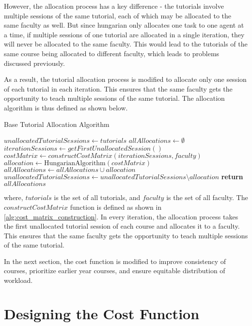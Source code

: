 However, the allocation process has a key difference - the tutorials involve multiple sessions of the same tutorial, each of which may be allocated to the same faculty as well. But since hungarian only allocates one task to one agent at a time, if multiple sessions of one tutorial are allocated in a single iteration, they will never be allocated to the same faculty. This would lead to the tutorials of the same course being allocated to different faculty, which leads to problems discussed previously.

As a result, the tutorial allocation process is modified to allocate only one session of each tutorial in each iteration. This ensures that the same faculty gets the opportunity to teach multiple sessions of the same tutorial. The allocation algorithm is thus defined as shown below.

\begin{algorithm}[H]
  \caption*{Base Tutorial Allocation Algorithm}
  \begin{algorithmic}
    \State $unallocatedTutorialSessions \gets tutorials$
    \State $allAllocations \gets \emptyset$
    \State $iterationSessions \gets getFirstUnallocatedSession()$
    \State $costMatrix \gets constructCostMatrix(iterationSessions, faculty)$
    \State $allocation \gets \text{HungarianAlgorithm}(costMatrix)$
    \State $allAllocations \gets allAllocations \cup allocation$
    \State $unallocatedTutorialSessions \gets unallocatedTutorialSessions \setminus allocation$
    \EndWhile
    \State \textbf{return} $allAllocations$
    \EndProcedure
  \end{algorithmic}
\end{algorithm}

where, $tutorials$ is the set of all tutorials, and $faculty$ is the set of all faculty. The $constructCostMatrix$ function is defined as shown in \autoref{alg:cost_matrix_construction}. In every iteration, the allocation process takes the first unallocated tutorial session of each course and allocates it to a faculty. This ensures that the same faculty gets the opportunity to teach multiple sessions of the same tutorial.

In the next section, the cost function is modified to improve consistency of courses, prioritize earlier year courses, and ensure equitable distribution of workload.

\section{Designing the Cost Function}

